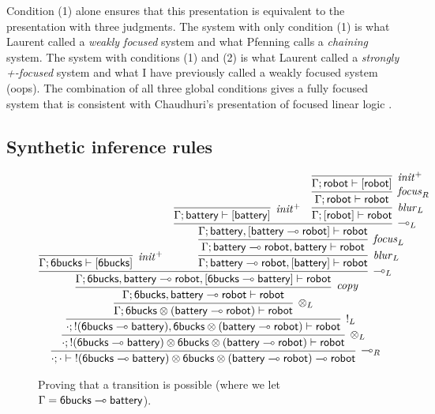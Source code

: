 \noindent
Condition (1) alone ensures that this presentation is equivalent to
the presentation with three judgments. The system with only condition
(1) is what Laurent called a {\it weakly focused} system
\cite{laurent04proof} and what Pfenning calls a {\it chaining} system.
The system with conditions (1) and (2) is what Laurent called a {\it
  strongly +-focused} system and what I have previously called a
weakly focused system (oops). The combination of all three global
conditions gives a fully focused system that is consistent with
Chaudhuri's presentation of focused linear logic
\cite{chaudhuri06focused}.

\subsection{Synthetic inference rules}

\begin{figure}
\[
\infer[{\lolli}_R]
{\mildseq{\cdot}{\cdot}{{!}({\sf 6bucks} \lolli {\sf battery}) \otimes
                    {\sf 6bucks} \otimes 
                    ({\sf battery} \lolli {\sf robot}) \lolli {\sf robot}}}
{\infer[{\otimes}_L]
{\mildseq{\cdot}{{!}({\sf 6bucks} \lolli {\sf battery}) \otimes
                    {\sf 6bucks} \otimes 
                    ({\sf battery} \lolli {\sf robot})}{{\sf robot}}}
{\infer[{!}_L]
{\mildseq{\cdot}{{!}({\sf 6bucks} \lolli {\sf battery}),
                    {\sf 6bucks} \otimes 
                    ({\sf battery} \lolli {\sf robot})}{{\sf robot}}}
{\infer[{\otimes}_L]
{\mildseq{\Gamma}{{\sf 6bucks} \otimes 
                    ({\sf battery} \lolli {\sf robot})}{{\sf robot}}}
{\infer[{\it copy}]
{\mildseq{\Gamma}{{\sf 6bucks}, {\sf battery} \lolli {\sf robot}}{{\sf robot}}}
{\infer[{\lolli}_L]
{\mildseq{\Gamma}{{\sf 6bucks}, {\sf battery} \lolli {\sf robot}, [{\sf 6bucks} \lolli {\sf battery}]}{{\sf robot}}}
{\infer[{\it init}^+]
 {\mildseq{\Gamma}{{\sf 6bucks}}{[{\sf 6bucks}]}}
 {}
 &
 \infer[{\it blur}_L]
 {\mildseq{\Gamma}{{\sf battery} \lolli {\sf robot}, [{\sf battery}]}{{\sf robot}}}
 {\infer[{\it focus}_L]
 {\mildseq{\Gamma}{{\sf battery} \lolli {\sf robot}, {\sf battery}}{{\sf robot}}}
 {\infer[{\lolli}_L]
 {\mildseq{\Gamma}{{\sf battery}, [{\sf battery} \lolli {\sf robot}]}{{\sf robot}}}
 {\infer[{\it init^+}]
  {\mildseq{\Gamma}{{\sf battery}}{[{\sf battery}]}}
  {}
  &
  \infer[{\it blur}_L]
  {\mildseq{\Gamma}{[{\sf robot}]}{{\sf robot}}}
  {\infer[{\it focus}_R]
  {\mildseq{\Gamma}{{\sf robot}}{{\sf robot}}}
  {\infer[{\it init}^+]
  {\mildseq{\Gamma}{{\sf robot}}{[{\sf robot}]}}
  {}}}}}}}}}}}}
\] 
\caption{Proving that a transition is possible 
(where we let $\Gamma = {\sf 6bucks} \multimap {\sf battery}$).}
\label{fig:unfocused-robot}
\end{figure}


